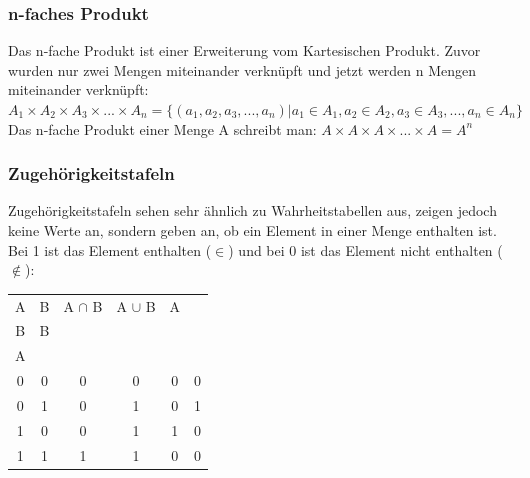 \documentclass{article}
\begin{document}
	\subsubsection{n-faches Produkt}
	Das n-fache Produkt ist einer Erweiterung vom Kartesischen Produkt. Zuvor wurden nur zwei Mengen miteinander verknüpft und jetzt werden n Mengen miteinander verknüpft: $A_1\times A_2 \times A_3 \times ...\times A_n = \{(a_1, a_2, a_3,...,a_n)|a_1 \in A_1, a_2 \in A_2, a_3 \in A_3,...,a_n \in A_n\}$ \\
	Das n-fache Produkt einer Menge A schreibt man: $A\times A\times A\times...\times A = A^n$
	\subsubsection{Zugehörigkeitstafeln}
	Zugehörigkeitstafeln sehen sehr ähnlich zu Wahrheitstabellen aus, zeigen jedoch keine Werte an, sondern geben an, ob ein Element in einer Menge enthalten ist. Bei 1 ist das Element enthalten ($\in$) und bei 0 ist das Element nicht enthalten ($\notin$):\\
	\begin{tabular}{cccccc}
		\toprule
		A & B & A $\cap$ B & A $\cup$ B & A \\ B & B \\ A \\ \midrule
		0 & 0 & 0 & 0 & 0 & 0 \\ \hline
		0 & 1 & 0 & 1 & 0 & 1 \\ \hline
		1 & 0 & 0 & 1 & 1 & 0 \\ \hline
		1 & 1 & 1 & 1 & 0 & 0 \\
		\bottomrule
	\end{tabular}
\end{document}
